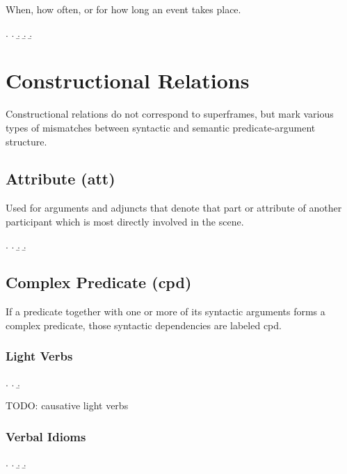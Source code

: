 \documentclass[a4paper]{article}
\begin{document}
When, how often, or for how long an event takes place.

\ex.
\a. 
\b. 
\b. 
\b. 

\clearpage
\section{Constructional Relations}

Constructional relations do not correspond to superframes, but mark various
types of mismatches between syntactic and semantic predicate-argument
structure.

\subsection{Attribute (\textsf{att})}
\label{sec:att}

Used for arguments and adjuncts that denote that part or attribute of another
participant which is most directly involved in the scene.

\ex.
\a. 
\b. 
\b. 

\clearpage
\subsection{Complex Predicate (\textsf{cpd})}
\label{sec:cpd}

If a predicate together with one or more of its syntactic arguments forms a
complex predicate, those syntactic dependencies are labeled \textsf{cpd}.

\subsubsection{Light Verbs}

\ex.
\a. 
\b. 

TODO: causative light verbs

\subsubsection{Verbal Idioms}

\ex.
\a. 
\b. 
\b. 
\end{document}
